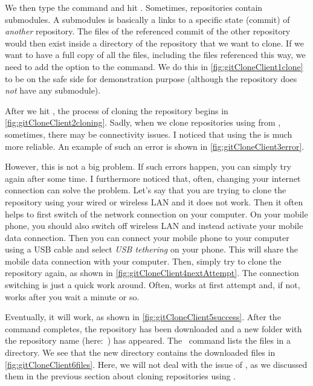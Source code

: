We then type the command  and hit \keys{\return}.
Sometimes, repositories contain submodules.
A submodules is basically a links to a specific state (commit) of \emph{another} repository.
The files of the referenced commit of the other repository would then exist inside a directory of the repository that we want to clone.
If we want to have a full copy of all the files, including the files referenced this way, we need to add the option  to the  command.
We do this in \cref{fig:gitCloneClient1clone} to be on the safe side for demonstration purpose (although the repository  does \emph{not} have any submodule).

After we hit \keys{\return}, the process of cloning the repository begins in \cref{fig:gitCloneClient2cloning}.
Sadly, when we clone repositories using   from \github, sometimes, there may be connectivity issues.
I noticed that using the   is much more reliable.
An example of such an error is shown in \cref{fig:gitCloneClient3error}.

However, this is not a big problem.
If such errors happen, you can simply try again after some time.
I furthermore noticed that, often, changing your internet connection can solve the problem.
Let's say that you are trying to clone the repository using your wired or wireless LAN and it does not work.
Then it often helps to first switch of the network connection on your computer.
On your mobile phone, you should also switch off wireless LAN and instead activate your mobile data connection.
Then you can connect your mobile phone to your computer using a USB cable and select \emph{USB tethering} on your phone.
This will share the mobile data connection with your computer.
Then, simply try to clone the repository again, as shown in \cref{fig:gitCloneClient4nextAttempt}.
The connection switching is just a quick work around.
Often,  works at first attempt and, if not, works after you wait a minute or so.

Eventually, it will work, as shown in \cref{fig:gitCloneClient5success}.
After the  command completes, the repository has been downloaded and a new folder with the repository name (here:~) has appeared.
The \bash\ command  lists the files in a directory.
We see that the new directory contains the downloaded files in \cref{fig:gitCloneClient6files}.
Here, we will not deal with the issue of , as we discussed them in the previous section about cloning repositories using \pycharm.%
%
\FloatBarrier%
\endhsection%
